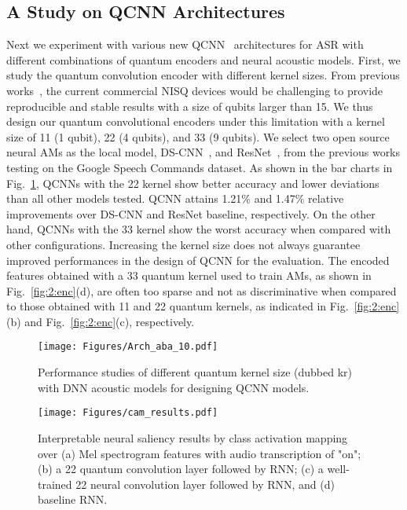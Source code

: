 \documentclass{article}
\begin{document}
\subsection{A Study on QCNN Architectures}
\label{sec:4:4}
Next we experiment with various new QCNN~\cite{henderson2020quanvolutional} architectures for ASR with different combinations of quantum encoders and neural acoustic models. First, we study the quantum convolution encoder with different kernel sizes. From previous works~\cite{chen2020quantum, chen2020variational}, the current commercial NISQ devices would be challenging to provide reproducible and stable results with a size of qubits larger than 15.
We thus design our quantum convolutional encoders under this limitation with a kernel size of 11 (1 qubit), 22 (4 qubits), and 33 (9 qubits).
We select two open source neural AMs as the local model, DS-CNN~\cite{zhang2017hello}, and ResNet~\cite{warden2018speech}, from the previous works testing on the Google Speech Commands dataset. As shown in the bar charts in Fig.~\ref{fig:aba}, QCNNs with the 22 kernel show better accuracy and lower deviations than all other models tested. QCNN attains 1.21\% and 1.47\% relative improvements over DS-CNN and ResNet baseline, respectively. On the other hand, QCNNs with the 33 kernel show the worst accuracy when compared with other configurations.
Increasing the kernel size does not always guarantee improved performances in the design of QCNN for the evaluation. The encoded features obtained with a 33 quantum kernel used to train AMs, as shown in Fig.~\ref{fig:2:enc}(d), are often too sparse and not as discriminative when compared to those obtained with 11 and 22 quantum kernels, as indicated in Fig.~\ref{fig:2:enc}(b) and Fig.~\ref{fig:2:enc}(c), respectively.


\begin{figure}[ht!]
\begin{center}
\vspace{-2mm}
  \centering    
\texttt{[image: Figures/Arch\_aba\_10.pdf]}
\end{center}
\vspace{-0.4cm}
  \caption{Performance studies of different quantum kernel size (dubbed kr) with DNN acoustic models for designing QCNN models. 
  } 
\label{fig:aba}
\end{figure}




\begin{figure}[ht!]
\begin{center}
\vspace{-2mm}
  \centering    

\texttt{[image: Figures/cam\_results.pdf]}
\end{center}
\vspace{-0.2cm}
  \caption{Interpretable neural saliency results by class activation mapping~\cite{zhou2016learning} over (a) Mel spectrogram features with audio transcription of "on"; (b) a 22 quantum convolution layer followed by RNN; (c) a well-trained 22 neural convolution layer followed by RNN, and (d) baseline RNN.
  } 
\label{fig:cam}
\end{figure}
\vspace{-0.2cm}
\end{document}

